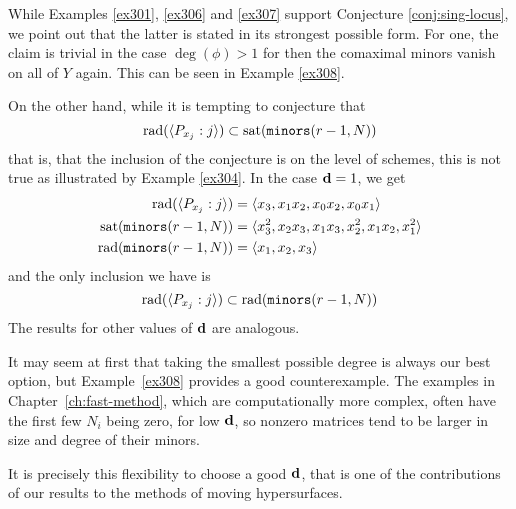 \documentclass[fleqn,reqno]{amsart}
\begin{document}
\begin{example}[$\mt{ex315}$]
\label{ex315}
While Examples \ref{ex301}, \ref{ex306} and \ref{ex307} support Conjecture \ref{conj:sing-locus},
we point out that the latter is stated in its strongest possible form.
For one, the claim is trivial in the case $\deg(\phi)>1$
for then the comaximal minors vanish on all of $Y$ again.
This can be seen in Example \ref{ex308}.

On the other hand, while it is tempting to conjecture that
\[
	\operatorname{rad}(\langle P_{x_j}:j\rangle)\subset\operatorname{sat}(\mathop{\tt minors}(r-1,N))
\]
that is, that the inclusion of the conjecture is on the level of schemes,
this is not true as illustrated by Example \ref{ex304}.
In the case $\mathbf d=1$, we get
\begin{align*}
	\operatorname{rad}(\langle P_{x_j}:j\rangle)&=\langle {x}_{3},{x}_{1} {x}_{2},{x}_{0} {x}_{2},{x}_{0} {x}_{1}\rangle\\
	\operatorname{sat}(\mathop{\tt minors}(r-1,N))&=\langle{x}_{3}^{2},{x}_{2} {x}_{3},{x}_{1} {x}_{3},{x}_{2}^{2},{x}_{1}
      {x}_{2},{x}_{1}^{2}\rangle\\
	\operatorname{rad}(\mathop{\tt minors}(r-1,N))&=\langle {x}_{1},{x}_{2},{x}_{3}\rangle
\end{align*}
and the only inclusion we have is
\[
	\operatorname{rad}(\langle P_{x_j}:j\rangle)\subset\operatorname{rad}(\mathop{\tt minors}(r-1,N))
\]
The results for other values of $\mathbf d$ are analogous.
\end{example}


\begin{example}
\label{ex317}
It may seem at first that taking the smallest possible degree is always our best option,
but Example~\ref{ex308} provides a good counterexample.
The examples in Chapter~\ref{ch:fast-method}, which are computationally more complex,
often have the first few $N_i$ being zero, for low $\mathbf d$,
so nonzero matrices tend to be larger in size and degree of their minors.

It is precisely this flexibility to choose a good $\mathbf d$,
that is one of the contributions of
our results to the methods of moving hypersurfaces.
\end{example}





\end{document}
